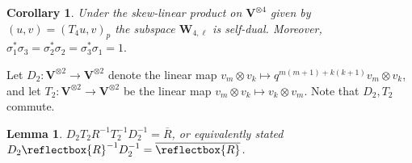 \documentclass[letterpaper]{amsart}
\newtheorem{lemma}[theorem]{Lemma}
\newtheorem{corollary}[theorem]{Corollary}
\begin{document}
\begin{corollary}
\label{preserved hermitian form}
Under the skew-linear product on $\textbf{V}^{\otimes 4}$ given by $(u, v) = (T_4u, v)_p$ the subspace $\textbf{W}_{4,\ell}$ is self-dual. Moreover, $\sigma_1^\ast \sigma_3 = \sigma_2^\ast \sigma_2 = \sigma_3^\ast \sigma_1 = 1.$
\end{corollary}
Let $D_2: \textbf{V}^{\otimes 2} \to \textbf{V}^{\otimes 2}$ denote the linear map $v_m \otimes v_k \mapsto q^{m(m+1) + k(k+1)} v_m \otimes v_k$, and let $T_2: \textbf{V}^{\otimes 2} \to \textbf{V}^{\otimes 2}$ be the linear map $v_m \otimes v_k \mapsto v_k \otimes v_m$. Note that $D_2,T_2$ commute.
\begin{lemma}
$D_2T_2R^{-1}T_2^{-1}D_2^{-1} = \overline{R}$, or equivalently stated $D_2 \reflectbox{R}^{-1}D_2^{-1} = \overline{\reflectbox{R}}$.
\end{lemma}
\end{document}

